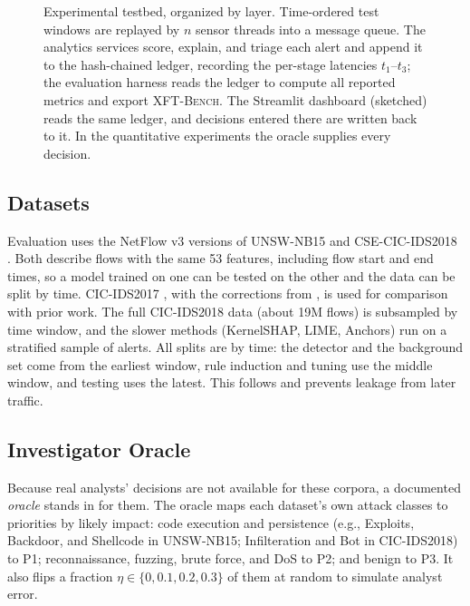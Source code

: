\documentclass[journal]{IEEEtran}
\begin{document}
\begin{figure}[t]
\caption{Experimental testbed, organized by layer. Time-ordered test windows are replayed by $n$ sensor threads into a message queue. The analytics services score, explain, and triage each alert and append it to the hash-chained ledger, recording the per-stage latencies $t_1$--$t_3$; the evaluation harness reads the ledger to compute all reported metrics and export \textsc{XFT-Bench}. The Streamlit dashboard (sketched) reads the same ledger, and decisions entered there are written back to it. In the quantitative experiments the oracle supplies every decision.}
\label{fig:testbed}
\end{figure}

\subsection{Datasets}
Evaluation uses the NetFlow v3 versions of UNSW-NB15 and CSE-CIC-IDS2018 \cite{nfv3,sarhan,unsw}. Both describe flows with the same 53 features, including flow start and end times, so a model trained on one can be tested on the other and the data can be split by time. CIC-IDS2017 \cite{cicids}, with the corrections from \cite{engelen}, is used for comparison with prior work. The full CIC-IDS2018 data (about 19M flows) is subsampled by time window, and the slower methods (KernelSHAP, LIME, Anchors) run on a stratified sample of alerts. All splits are by time: the detector and the background set come from the earliest window, rule induction and tuning use the middle window, and testing uses the latest. This follows \cite{arp} and prevents leakage from later traffic.

\subsection{Investigator Oracle}
Because real analysts' decisions are not available for these corpora, a documented \emph{oracle} stands in for them. The oracle maps each dataset's own attack classes to priorities by likely impact: code execution and persistence (e.g., Exploits, Backdoor, and Shellcode in UNSW-NB15; Infilteration and Bot in CIC-IDS2018) to P1; reconnaissance, fuzzing, brute force, and DoS to P2; and benign to P3. It also flips a fraction $\eta\in\{0,0.1,0.2,0.3\}$ of them at random to simulate analyst error.
\end{document}
